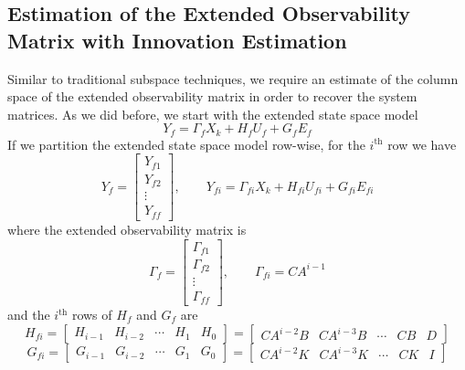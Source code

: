 \subsection{Estimation of the Extended Observability Matrix with Innovation Estimation}
Similar to traditional subspace techniques, we require an estimate of the column space of the extended observability matrix in order to recover the system matrices. As we did before, we start with the extended state space model
\begin{equation}\label{eq:3_extended_state_space_future_cl}
Y_f = \Gamma_f X_k + H_f U_f + G_f E_f
\end{equation}
If we partition the extended state space model row-wise, for the $i^{\mbox{th}}$ row we have
\begin{equation}\label{eq:3_extended_state_space_row}
Y_f = \begin{bmatrix}
Y_{f1}\\ Y_{f2}\\ \vdots \\ Y_{ff}
\end{bmatrix}, \qquad 
Y_{fi} = \Gamma_{fi} X_k + H_{fi} U_{fi} + G_{fi} E_{fi}
\end{equation}
where the extended observability matrix is
\begin{equation*}
\Gamma_f = \begin{bmatrix}
\Gamma_{f1}\\ \Gamma_{f2}\\ \vdots \\ \Gamma_{ff}
\end{bmatrix}, \qquad \Gamma_{fi} = CA^{i-1}
\end{equation*}
and the $i^{\mbox{th}}$ rows of $H_f$ and $G_f$ are
\begin{equation*}
H_{fi} = \begin{bmatrix} H_{i-1} & H_{i-2} & \cdots & H_1 & H_0\end{bmatrix} = \begin{bmatrix} CA^{i-2}B & CA^{i-3}B & \cdots & CB & D\end{bmatrix} 
\end{equation*}
\begin{equation*}
G_{fi} = \begin{bmatrix} G_{i-1} & G_{i-2} & \cdots & G_1 & G_0\end{bmatrix} = \begin{bmatrix} CA^{i-2}K & CA^{i-3}K & \cdots & CK & I\end{bmatrix}
\end{equation*}
